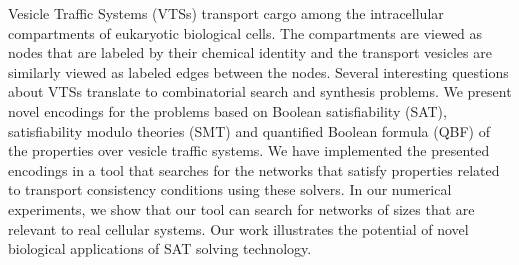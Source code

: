 Vesicle Traffic Systems (VTSs) transport cargo among the intracellular compartments of eukaryotic biological cells.
%
The compartments are viewed as nodes that are labeled by their chemical identity and the transport vesicles are similarly viewed as labeled edges between the nodes.
%
Several interesting questions about VTSs translate to combinatorial search and synthesis problems. 
%
We present novel encodings for the problems
based on Boolean satisfiability (SAT), satisfiability modulo theories (SMT) and
quantified Boolean formula (QBF) of the properties over vesicle traffic systems.
%
We have implemented the presented encodings in a tool that searches for the networks that satisfy properties related to transport consistency conditions using these solvers. 
%
In our numerical experiments, we show that our tool can search for networks of sizes that are relevant to real cellular systems.
%
Our work illustrates the potential of novel biological applications of
SAT solving technology.

%
%
%

